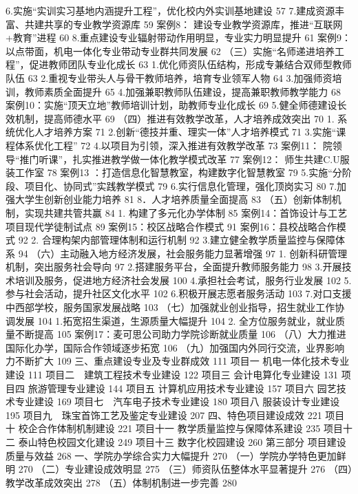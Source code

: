 6.实施“实训实习基地内涵提升工程”，优化校内外实训基地建设	57
7.建成资源丰富、共建共享的专业教学资源库	59
案例8： 建设专业教学资源库，推进“互联网+教育”进程	60
8.重点建设专业辐射带动作用明显，专业实力明显提升	61
案例9：以点带面，机电一体化专业带动专业群共同发展	62
（三）实施“名师递进培养工程”，促进教师团队专业化成长	63
1.优化师资队伍结构，形成专兼结合双师型教师队伍	63
2.重视专业带头人与骨干教师培养，培育专业领军人物	64
3.加强师资培训，教师素质全面提升	65
4.加强兼职教师队伍建设，提高兼职教师教学能力	68
案例10：实施“顶天立地”教师培训计划，助教师专业化成长	69
5.健全师德建设长效机制，提高师德水平	69
（四）推进有效教学改革，人才培养成效突出	70
1. 系统优化人才培养方案	71
2.创新“德技并重、理实一体”人才培养模式	71
3.实施“课程体系优化工程”	72
4.以项目为引领，深入推进有效教学改革	73
案例11： 院领导“推门听课”，扎实推进教学做一体化教学模式改革	77
案例12： 师生共建C.U服装工作室	78
案例13 ：打造信息化智慧教室，构建数字化智慧教室	79
5.实施“分阶段、项目化、协同式”实践教学模式	79
6.实行信息化管理，强化顶岗实习	80
7.加强大学生创新创业能力培养	81
8．人才培养质量全面提高	83
（五）创新体制机制，实现共建共管共赢	84
1. 构建了多元化办学体制	85
案例14：首饰设计与工艺项目现代学徒制试点	89
案例15：校区战略合作模式	91
案例16：县校战略合作模式	92
2. 合理构架内部管理体制和运行机制	92
3.建立健全教学质量监控与保障体系	94
（六）主动融入地方经济发展，社会服务能力显著增强	97
1. 创新科研管理机制，突出服务社会导向	97
2.搭建服务平台，全面提升教师服务能力	98
3.开展技术培训及服务，促进地方经济社会发展	100
4.承担社会考试，服务行业发展	102
5.参与社会活动，提升社区文化水平	102
6.积极开展志愿者服务活动	103
7.对口支援中西部学校，服务国家发展战略	103
（七）加强就业创业指导，招生就业工作协调发展	104
1.拓宽招生渠道，生源质量大幅提升	104
2. 全方位服务就业，就业质量不断提高	105
案例17：麦可思公司助力学院诊断就业质量	106
（八）大力推进国际化办学，国际合作领域逐步拓宽	106
（九）加强国内外同行交流，业界影响力不断扩大	109
三、重点建设专业及专业群成效	111
项目一  机电一体化技术专业建设	111
项目二　建筑工程技术专业建设	122
项目三  会计电算化专业建设	131
项目四  旅游管理专业建设	144
项目五  计算机应用技术专业建设	157
项目六  园艺技术专业建设	169
项目七　汽车电子技术专业建设	180
项目八  服装设计专业建设	195
项目九　珠宝首饰工艺及鉴定专业建设	207
四、特色项目建设成效	221
项目十    校企合作体制机制建设	221
项目十一  教学质量监控与保障体系建设	235
项目十二  泰山特色校园文化建设	249
项目十三  数字化校园建设	260
第三部分   项目建设质量与效益	268
一、学院办学综合实力大幅提升	270
（一）学院办学特色更加鲜明	270
（二）专业建设成效明显	275
（三）师资队伍整体水平显著提升	276
（四）教学改革成效突出	278
（五）体制机制进一步完善	280
